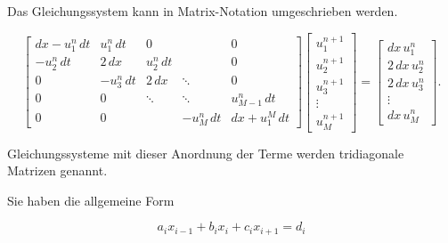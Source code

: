Das Gleichungssystem kann in Matrix-Notation umgeschrieben werden.

\begin{equation}
\left[{\begin{matrix}
{dx- u_{1}^{n}\, dt}&{ u_{1}^{n} \, dt}&{0}&{}&{0}\\[5pt]
{-u_{2}^{n} \, dt}&{ 2 \, dx}&{ u_{2}^{n} \, dt}&{}&{0}\\[5pt]
{0}&{-u_{3}^{n} \, dt}&{ 2 \, dx}&\ddots &{0}\\[5pt]
{0}&{0}&\ddots &\ddots &{ u_{M-1}^{n} \, dt}\\[5pt]
{0}&{0}&{}&{-u_{M}^{n} \, dt}&{dx + u_{1}^{M}\, dt}
\end{matrix}}
\right]\left[{\begin{matrix}
{ u_{1}^{n+1}}\\[5pt]
{ u_{2}^{n+1}}\\[5pt]
{ u_{3}^{n+1}}\\[5pt]
\vdots \\[5pt]
{ u_{M}^{n+1}}
\end{matrix}}\right]
=\left[{\begin{matrix}
{dx \, u_{1}^{n}}\\[5pt]
{ 2 \, dx \, u_{2}^{n}}\\[5pt]
{ 2 \, dx \, u_{3}^{n}}\\[5pt]
\vdots \\[5pt]
{dx \, u_{M}^{n}}
\end{matrix}}\right].
  \end{equation}

Gleichungssysteme mit dieser Anordnung der Terme werden tridiagonale Matrizen genannt.

Sie haben die allgemeine Form

  \begin{equation}
    a_{i}x_{{i-1}}+b_{i}x_{i}+c_{i}x_{{i+1}}=d_{i}
  \end{equation}


